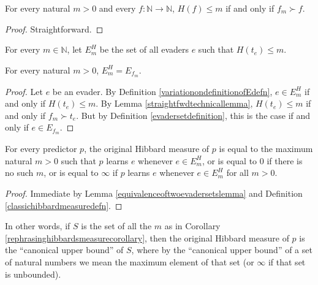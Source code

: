 \documentclass[twoside,11pt]{article}
\begin{document}
\begin{lemma}
\label{straightfwdtechnicallemma}
    For every natural $m>0$ and every $f:\mathbb N\to\mathbb N$,
    $H(f)\leq m$ if and only if $f_m\succ f$.
\end{lemma}

\begin{proof}
    Straightforward.
\end{proof}

\begin{definition}
\label{variationondefinitionofEdefn}
    For every $m\in\mathbb N$, let $E^H_m$
    be the set of all evaders $e$ such that $H(t_e)\leq m$.
\end{definition}

\begin{lemma}
\label{equivalenceoftwoevadersetslemma}
    For every natural $m>0$, $E^H_m=E_{f_m}$.
\end{lemma}

\begin{proof}
    Let $e$ be an evader. By Definition \ref{variationondefinitionofEdefn},
    $e\in E^H_m$ if and only if $H(t_e)\leq m$.
    By Lemma \ref{straightfwdtechnicallemma}, $H(t_e)\leq m$ if and only if
    $f_m\succ t_e$. But by Definition \ref{evadersetdefinition}, this is the
    case if and only if $e\in E_{f_m}$.
\end{proof}

\begin{corollary}
\label{rephrasinghibbardsmeasurecorollary}
    For every predictor $p$, the original Hibbard measure of $p$
    is equal to the maximum natural $m>0$ such that
    $p$ learns $e$ whenever $e\in E^H_m$,
    or is equal to $0$ if there is no such $m$,
    or is equal to $\infty$
    if $p$ learns $e$ whenever $e\in E^H_m$ for all $m>0$.
\end{corollary}

\begin{proof}
    Immediate by Lemma \ref{equivalenceoftwoevadersetslemma}
    and Definition \ref{classichibbardmeasuredefn}.
\end{proof}

In other words, if $S$ is the set of all the $m$ as in Corollary
\ref{rephrasinghibbardsmeasurecorollary}, then the original Hibbard
measure of $p$ is the ``canonical upper bound'' of $S$, where
by the ``canonical upper bound'' of a set of natural numbers
we mean the maximum element of that set (or $\infty$ if that set
is unbounded).
\end{document}
